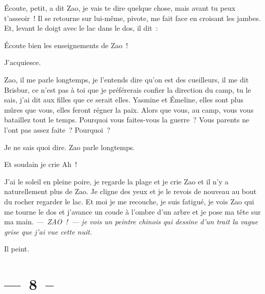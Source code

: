 \documentclass[french,twoside]{book} %
\begin{document}
\par
\bigbreak
\noindent Écoute, petit, a dit Zao, je vais te dire quelque chose, mais avant tu peux t’asseoir ! Il se retourne sur lui-même, pivote, me fait face en croisant les jambes. Et, levant le doigt avec le lac dans le dos, il dit :\par
Écoute bien les enseignements de Zao !\par
J’acquiesce.\par
Zao, il me parle longtemps, je l’entends dire qu’on est des cueilleurs, il me dit Brisbur, ce n’est pas à toi que je préférerais confier la direction du camp, tu le sais, j’ai dit aux filles que ce serait elles. Yasmine et Émeline, elles sont plus mûres que vous, elles feront régner la paix. Alors que vous, au camp, vous vous bataillez tout le temps. Pourquoi vous faites-vous la guerre ? Vous parents ne l’ont pas assez faite ? Pourquoi ?\par
Je ne sais quoi dire. Zao parle longtemps.\par
Et soudain je crie Ah !\par
J’ai le soleil en pleine poire, je regarde la plage et je crie Zao et il n’y a naturellement plus de Zao. Je cligne des yeux et je le revois de nouveau au bout du rocher regarder le lac. Et moi je me recouche, je suis fatigué, je vois Zao qui me tourne le dos et j’avance un coude à l’ombre d’un arbre et je pose ma tête sur ma main. \emph{— ZAO ! — je vois un peintre chinois qui dessine d’un trait la vague grise que j’ai vue cette nuit.}\par
Il peint.

\section[{— 8 –}]{— 8 –}
\renewcommand{\leftmark}{— 8 –}
\end{document}
